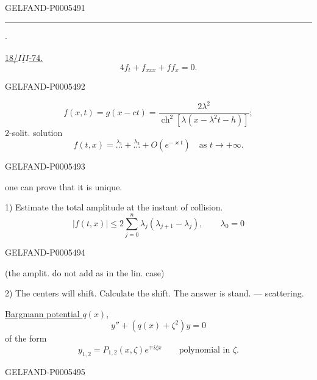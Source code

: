 \begin{GelfandAdjacentEvidence}{GELFAND-P000549}{1}
\hfill\rule{1.5cm}{.35pt}\enspace\(\cdot\)\par
\uline{18/\mbox{$\overline{\underline{III}}$}-74.}\qquad
{}\qquad{}
\[
4f_t+f_{xxx}+ff_x=0.
\]
\end{GelfandAdjacentEvidence}
\begin{GelfandAdjacentEvidence}{GELFAND-P000549}{2}

\[
f(x,t)=g(x-ct)=
\frac{2\lambda^2}{\operatorname{ch}^2[\lambda(x-\lambda^2t-h)]};
\]
2-solit. solution
\[
f(t,x)=\overset{\lambda_1}{\ldots}+\overset{\lambda_2}{\ldots}
+O(e^{-\varkappa t})\quad\text{as }t\to+\infty.
\]
\end{GelfandAdjacentEvidence}
\begin{GelfandAdjacentEvidence}{GELFAND-P000549}{3}

one can prove that it is unique.

1) Estimate the total amplitude at the instant of collision.
\[
|f(t,x)|\le2\sum_{j=0}^{n}\lambda_j(\lambda_{j+1}-\lambda_j),
\qquad\lambda_0=0
\]
\end{GelfandAdjacentEvidence}
\begin{GelfandAdjacentEvidence}{GELFAND-P000549}{4}

(the amplit. do not add as in the lin. case)

2) The centers will shift. Calculate the shift. The answer is stand. — scattering.

\uline{Bargmann potential \mbox{$q(x)$}}, 
\[
y''+(q(x)+\zeta^2)y=0
\]
of the form
\[
y_{1,2}=P_{1,2}(x,\zeta)e^{\mp i\zeta x}
\qquad\text{polynomial in }\zeta.
\]
\end{GelfandAdjacentEvidence}
\begin{GelfandAdjacentEvidence}{GELFAND-P000549}{5}

\end{GelfandAdjacentEvidence}



